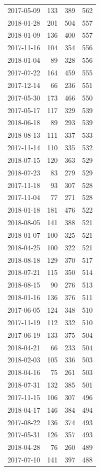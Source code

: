 \begin{tabular}{lrrr}
2017-05-09 & 133 & 389 & 562 \\
2018-01-28 & 201 & 504 & 557 \\
2018-01-09 & 136 & 400 & 557 \\
2017-11-16 & 104 & 354 & 556 \\
2018-01-04 & 89 & 328 & 556 \\
2017-07-22 & 164 & 459 & 555 \\
2017-12-14 & 66 & 236 & 551 \\
2017-05-30 & 173 & 466 & 550 \\
2017-05-17 & 117 & 329 & 539 \\
2018-06-18 & 89 & 293 & 539 \\
2018-08-13 & 111 & 337 & 533 \\
2017-11-14 & 110 & 335 & 532 \\
2018-07-15 & 120 & 363 & 529 \\
2018-07-23 & 83 & 279 & 529 \\
2017-11-18 & 93 & 307 & 528 \\
2017-11-04 & 77 & 271 & 528 \\
2018-01-18 & 181 & 476 & 522 \\
2018-08-05 & 141 & 388 & 521 \\
2018-01-07 & 100 & 325 & 521 \\
2018-04-25 & 100 & 322 & 521 \\
2018-08-18 & 129 & 370 & 517 \\
2018-07-21 & 115 & 350 & 514 \\
2018-08-15 & 90 & 276 & 513 \\
2018-01-16 & 136 & 376 & 511 \\
2017-06-05 & 124 & 348 & 510 \\
2017-11-19 & 112 & 332 & 510 \\
2017-06-19 & 133 & 375 & 504 \\
2018-04-21 & 66 & 233 & 504 \\
2018-02-03 & 105 & 336 & 503 \\
2018-04-16 & 75 & 261 & 503 \\
2018-07-31 & 132 & 385 & 501 \\
2017-11-15 & 106 & 307 & 496 \\
2018-04-17 & 146 & 384 & 494 \\
2017-08-22 & 136 & 374 & 493 \\
2017-05-31 & 126 & 357 & 493 \\
2018-04-28 & 76 & 260 & 489 \\
2017-07-10 & 141 & 397 & 488 \\

\end{tabular}
